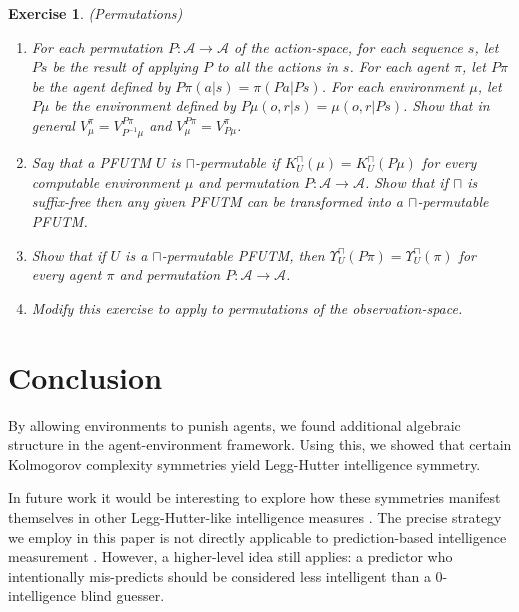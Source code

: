 \documentclass[runningheads]{llncs}
\newtheorem{myexercise}[mytheorem]{Exercise}
\def\LH{\Upsilon}
\begin{document}
\begin{myexercise} (Permutations)
    \begin{enumerate}
        \item
        For each permutation $P:\mathcal A\to\mathcal A$ of the action-space,
        for each sequence $s$,
        let $Ps$ be the result of applying $P$ to all the actions in $s$.
        For each agent $\pi$, let $P\pi$ be the agent defined by
        $P\pi(a|s)=\pi(Pa|Ps)$. For each environment $\mu$, let
        $P\mu$ be the environment defined by
        $P\mu(o,r|s)=\mu(o,r|Ps)$. Show that in general
        $V^\pi_\mu = V^{P\pi}_{P^{-1}\mu}$
        and
        $V^{P\pi}_\mu = V^\pi_{P\mu}$.
        \item
        Say that a PFUTM $U$ is \emph{$\sqcap$-permutable} if
        $K^\sqcap_U(\mu)=K^\sqcap_U(P\mu)$ for every computable environment $\mu$
        and permutation $P:\mathcal A\to\mathcal A$. Show that if $\sqcap$ is
        suffix-free then any given
        PFUTM can be transformed into a $\sqcap$-permutable PFUTM.
        \item
        Show that if $U$ is a $\sqcap$-permutable PFUTM,
        then $\LH^\sqcap_U(P\pi)=\LH^\sqcap_U(\pi)$
        for every agent $\pi$ and permutation $P:\mathcal A\to\mathcal A$.
        \item
        Modify this exercise to apply to permutations
        of the observation-space.
    \end{enumerate}
\end{myexercise}

\section{Conclusion}
\label{conclusionsecn}

By allowing environments to punish agents,
we found additional algebraic structure in the agent-environment
framework. Using this, we showed
that certain Kolmogorov complexity symmetries yield
Legg-Hutter intelligence symmetry.

In future work it would be interesting to explore how these symmetries
manifest themselves in other Legg-Hutter-like intelligence measures
\cite{gavane} \cite{goertzel2006patterns} \cite{hernandez}.
The precise strategy we employ in this
paper is not directly applicable to prediction-based intelligence measurement
\cite{hibbard} \cite{alexander2021measuring}
\cite{gamez2021measuring}. However, a higher-level
idea still applies:
a predictor who intentionally mis-predicts
should be considered less intelligent than a $0$-intelligence blind guesser.
\end{document}
